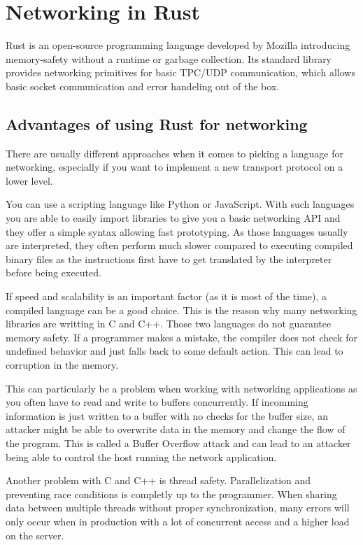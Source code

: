 
\section{Networking in Rust}
Rust is an open-source programming language developed by Mozilla introducing memory-safety without a runtime or garbage
collection. Its standard library provides networking primitives for basic TPC/UDP communication, which allows basic
socket communication and error handeling out of the box. \cite{rust-language}

\subsection{Advantages of using Rust for networking}
There are usually different approaches when it comes to picking a language for networking, especially if you want to
implement a new transport protocol on a lower level.

You can use a scripting language like Python or JavaScript. With such languages you are able to easily import libraries
to give you a basic networking API and they offer a simple syntax allowing fast prototyping. As those languages usually
are interpreted, they often perform much slower compared to executing compiled binary files as the instructions first
have to get translated by the interpreter before being executed.

If speed and scalability is an important factor (as it is most of the time), a compiled language can be a good choice.
This is the reason why many networking libraries are writting in C and C++. Those two languages do not guarantee memory
safety. If a programmer makes a mistake, the compiler does not check for undefined behavior and just falls back to some
default action. This can lead to corruption in the memory.

This can particularly be a problem when working with networking applications as you often have to read and write to
buffers concurrently. If incomming information is just written to a buffer with no checks for the buffer size, an
attacker might be able to overwrite data in the memory and change the flow of the program. This is called a Buffer
Overflow attack and can lead to an attacker being able to control the host running the network application.
\cite{821514}

Another problem with C and C++ is thread safety. Parallelization and preventing race conditions is completly up to the
programmer. When sharing data between multiple threads without proper synchronization, many errors will only occur when
in production with a lot of concurrent access and a higher load on the server.

